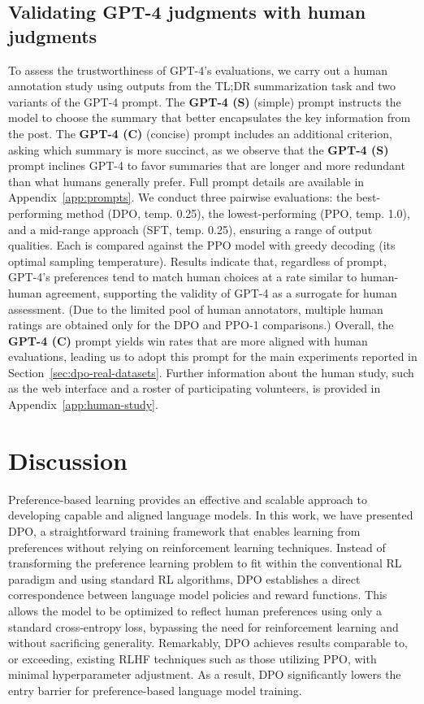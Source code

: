 \subsection{Validating GPT-4 judgments with human judgments}
\label{sec:human-judgments}
To assess the trustworthiness of GPT-4's evaluations, we carry out a human annotation study using outputs from the TL;DR summarization task and two variants of the GPT-4 prompt. The \textbf{GPT-4 (S)} (simple) prompt instructs the model to choose the summary that better encapsulates the key information from the post. The \textbf{GPT-4 (C)} (concise) prompt includes an additional criterion, asking which summary is more succinct, as we observe that the \textbf{GPT-4 (S)} prompt inclines GPT-4 to favor summaries that are longer and more redundant than what humans generally prefer. Full prompt details are available in Appendix~\ref{app:prompts}. We conduct three pairwise evaluations: the best-performing method (DPO, temp. 0.25), the lowest-performing (PPO, temp. 1.0), and a mid-range approach (SFT, temp. 0.25), ensuring a range of output qualities. Each is compared against the PPO model with greedy decoding (its optimal sampling temperature). Results indicate that, regardless of prompt, GPT-4's preferences tend to match human choices at a rate similar to human-human agreement, supporting the validity of GPT-4 as a surrogate for human assessment. (Due to the limited pool of human annotators, multiple human ratings are obtained only for the DPO and PPO-1 comparisons.) Overall, the \textbf{GPT-4 (C)} prompt yields win rates that are more aligned with human evaluations, leading us to adopt this prompt for the main experiments reported in Section~\ref{sec:dpo-real-datasets}. Further information about the human study, such as the web interface and a roster of participating volunteers, is provided in Appendix~\ref{app:human-study}.

\section{Discussion}
Preference-based learning provides an effective and scalable approach to developing capable and aligned language models. In this work, we have presented DPO, a straightforward training framework that enables learning from preferences without relying on reinforcement learning techniques. Instead of transforming the preference learning problem to fit within the conventional RL paradigm and using standard RL algorithms, DPO establishes a direct correspondence between language model policies and reward functions. This allows the model to be optimized to reflect human preferences using only a standard cross-entropy loss, bypassing the need for reinforcement learning and without sacrificing generality. Remarkably, DPO achieves results comparable to, or exceeding, existing RLHF techniques such as those utilizing PPO, with minimal hyperparameter adjustment. As a result, DPO significantly lowers the entry barrier for preference-based language model training.


